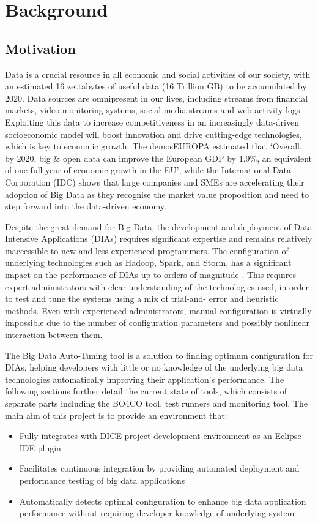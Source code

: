 \section{Background}
\subsection{Motivation}
Data is a crucial resource in all economic and social activities of our society, with an estimated 16 zettabytes of useful data (16 Trillion GB) \cite{a} to be accumulated by 2020. Data sources are omnipresent in our lives, including streams from financial markets, video monitoring systems, social media streams and web activity logs. Exploiting this data to increase competitiveness in an increasingly data-driven socioeconomic model will boost innovation and drive cutting-edge technologies, which is key to economic growth. The demosEUROPA \cite{b} estimated that ‘Overall, by 2020, big \& open data can improve the European GDP by 1.9\%, an equivalent of one full year of economic growth in the EU’, while the International Data Corporation (IDC) \cite{c} shows that large companies and SMEs are accelerating their adoption of Big Data as they recognise the market value proposition and need to step forward into the data-driven economy.

Despite the great demand for Big Data, the development and deployment of Data Intensive Applications (DIAs) requires significant expertise and remains relatively inaccessible to new and less experienced programmers. The configuration of underlying technologies such as Hadoop, Spark, and Storm, has a significant impact on the performance of DIAs up to orders of magnitude \cite{bo4co}. This requires expert administrators with clear understanding of the technologies used, in order to test and tune the systems using a mix of trial-and- error and heuristic methods. Even with experienced administrators, manual configuration is virtually impossible due to the number of configuration parameters and possibly nonlinear interaction between them.

The Big Data Auto-Tuning tool is a solution to finding optimum configuration for DIAs, helping developers with little or no knowledge of the underlying big data technologies automatically improving their application’s performance. The following sections further detail the current state of tools, which consists of separate parts including the BO4CO tool, test runners and monitoring tool. The main aim of this project is to provide an environment that:
\begin{itemize}
\item Fully integrates with DICE project development environment as an Eclipse IDE plugin
\item Facilitates continuous integration by providing automated deployment and performance testing of big data applications
\item Automatically detects optimal configuration to enhance big data application performance without requiring developer knowledge of underlying system 
\end{itemize}
\newpage

